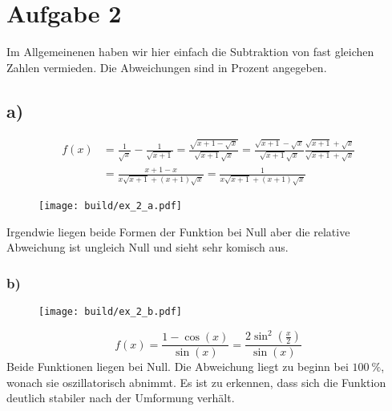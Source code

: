 \section*{Aufgabe 2}
Im Allgemeinenen haben wir hier einfach die Subtraktion von fast gleichen Zahlen vermieden.
Die Abweichungen sind in Prozent angegeben.
\subsection*{a)}
\begin{align*}
    f(x) &= \frac{1}{\sqrt{x}} - \frac{1}{\sqrt{x+1}}
    = \frac{\sqrt{x+1 - \sqrt{x}}}{\sqrt{x+1}\sqrt{x}}
    = \frac{\sqrt{x+1} - \sqrt{x}}{\sqrt{x+1}\sqrt{x}} \frac{\sqrt{x+1} + \sqrt{x}}{\sqrt{x+1} + \sqrt{x}} \\
    &= \frac{x+1-x}{x \sqrt{x+1} + (x+1)\sqrt{x}}  =
    \frac{1}{x \sqrt{x+1} + (x+1)\sqrt{x}}
\end{align*}
\begin{figure}
    \centering
    \texttt{[image: build/ex\_2\_a.pdf]}
\end{figure}
Irgendwie liegen beide Formen der Funktion bei Null aber die relative Abweichung ist ungleich Null und sieht sehr komisch aus.
\FloatBarrier
\subsubsection*{b)}
\begin{figure}
    \centering
    \texttt{[image: build/ex\_2\_b.pdf]}
\end{figure}
\begin{equation*}
    f(x) = \frac{1- \cos (x)}{\sin (x)} = \frac{2\sin^2(\frac{x}{2})}{\sin(x)}
\end{equation*}
Beide Funktionen liegen bei Null.
Die Abweichung liegt zu beginn bei $\qty{100}{\percent}$, wonach sie oszillatorisch abnimmt.
Es ist zu erkennen, dass sich die Funktion deutlich stabiler nach der Umformung verhält.
\FloatBarrier
